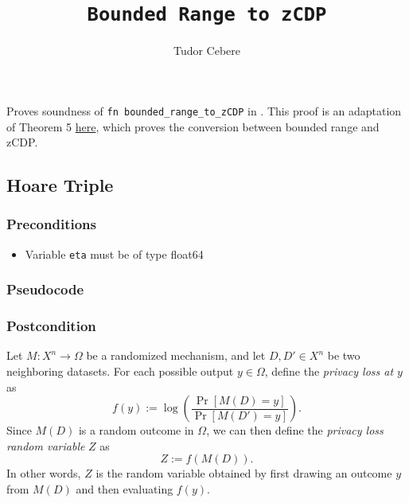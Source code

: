 \documentclass{article}
\title{\texttt{Bounded Range to zCDP}}
\author{Tudor Cebere}
\begin{document}
\maketitle

\contrib
Proves soundness of \texttt{fn bounded\_range\_to\_zCDP} in .
This proof is an adaptation of Theorem 5 \href{https://differentialprivacy.org/exponential-mechanism-bounded-range/}{here}, which proves the conversion between bounded range \cite{durfee2019practical} and zCDP.

\subsection{Hoare Triple}
\subsubsection*{Preconditions}
\begin{itemize}
    \item Variable \texttt{eta} must be of type float64
\end{itemize}

\subsubsection*{Pseudocode}



\subsubsection*{Postcondition}
\begin{definition}
    Let $M : X^n \to \Omega$ be a randomized mechanism, and let $D, D' \in X^n$ be two neighboring datasets. 
    For each possible output $y \in \Omega$, define the \emph{privacy loss at $y$} as
    \begin{equation}
      f(y) := \log\left(\frac{\Pr[M(D) = y]}{\Pr[M(D') = y]}\right).
    \end{equation}
    Since $M(D)$ is a random outcome in $\Omega$, we can then define the \emph{privacy loss random variable} $Z$ as
    \begin{equation}
      Z := f(M(D)).
    \end{equation}
    In other words, $Z$ is the random variable obtained by first drawing an outcome $y$ from $M(D)$ and then evaluating $f(y)$.
  \end{definition}
  
\end{document}
